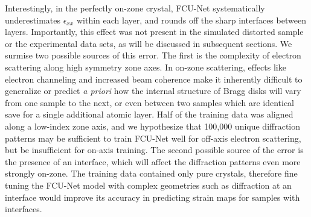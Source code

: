 \documentclass[%
 reprint,
superscriptaddress,
 amsmath,
 amssymb,
 prl,
]{revtex4-2}
\begin{document}

Interestingly, in the perfectly on-zone crystal, FCU-Net systematically underestimates $\epsilon_{xx}$ within each layer, and rounds off the sharp interfaces between layers. Importantly, this effect was not present in the simulated distorted sample or the experimental data sets, as will be discussed in subsequent sections. We surmise two possible sources of this error. The first is the complexity of electron scattering along high symmetry zone axes. In on-zone scattering, effects like electron channeling and increased beam coherence make it inherently difficult to generalize or predict \textit{a priori} how the internal structure of Bragg disks will vary from one sample to the next, or even between two samples which are identical save for a single additional atomic layer. Half of the training data was aligned along a low-index zone axis, and we hypothesize that 100,000 unique diffraction patterns may be sufficient to train FCU-Net well for off-axis electron scattering, but be insufficient for on-axis training. The second possible source of the error is the presence of an interface, which will affect the diffraction patterns even more strongly on-zone. The training data contained only pure crystals, therefore fine tuning the FCU-Net model with complex geometries such as diffraction at an interface would improve its accuracy in predicting strain maps for samples with interfaces.
\end{document}
